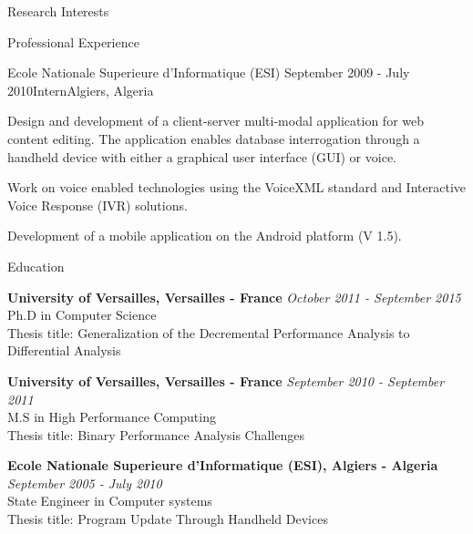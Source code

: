 \documentclass{resume} %
\begin{document}
\begin{rSection}{Research Interests}
\begin{rSection}{Professional Experience}
\begin{rSubsection}{Ecole Nationale Superieure d'Informatique (ESI)}
                   {September 2009 - July 2010}{Intern}{Algiers, Algeria}
\item Design and development of a client-server multi-modal application for web 
      content editing. The application enables database interrogation through a 
      handheld device with either a graphical user interface (GUI) or voice.
\item Work on voice enabled technologies using the VoiceXML standard and 
      Interactive Voice Response (IVR) solutions.
\item Development of a mobile application on the Android platform (V 1.5).  
\end{rSubsection}

\end{rSection}

\begin{rSection}{Education}

{\bf University of Versailles, Versailles - France} \hfill {\em October 2011 - September 2015} \\ 
Ph.D in Computer Science\\
Thesis title: Generalization of the Decremental Performance Analysis to Differential Analysis

{\bf University of Versailles, Versailles - France} \hfill {\em September 2010 - September 2011} \\ 
M.S in High Performance Computing\\
Thesis title: Binary Performance Analysis Challenges

{\bf Ecole Nationale Superieure d'Informatique (ESI), Algiers - Algeria} \hfill {\em September 2005 - July 2010} \\ 
State Engineer in Computer systems\\
Thesis title: Program Update Through Handheld Devices 
\end{rSection}




\end{rSection}
\end{document}
